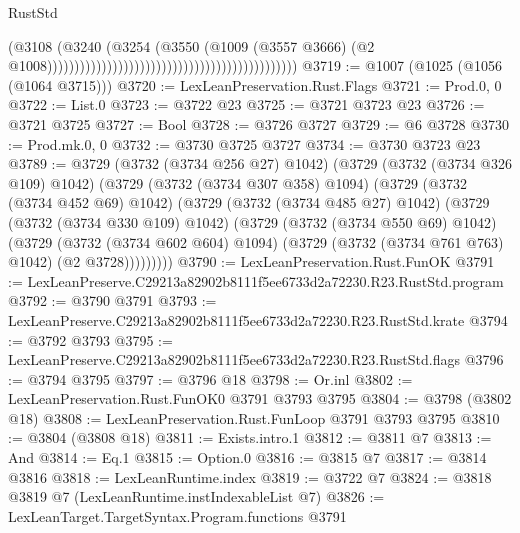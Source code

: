 \begin{lexlean}{RustStd}
\begin{coremodule}
                                                                                    (@3108
                                                                                      (@3240
                                                                                        (@3254
                                                                                          (@3550
                                                                                            (@1009
                                                                                              (@3557
                                                                                                @3666)
                                                                                              (@2
                                                                                                @1008))))))))))))))))))))))))))))))))))))))))))))))
@3719 := @1007 (@1025 (@1056 (@1064 @3715)))
@3720 := LexLeanPreservation.Rust.Flags
@3721 := Prod.{0, 0}
@3722 := List.{0}
@3723 := @3722 @23
@3725 := @3721 @3723 @23
@3726 := @3721 @3725
@3727 := Bool
@3728 := @3726 @3727
@3729 := @6 @3728
@3730 := Prod.mk.{0, 0}
@3732 := @3730 @3725 @3727
@3734 := @3730 @3723 @23
@3789 := @3729
    (@3732 (@3734 @256 @27) @1042)
    (@3729
      (@3732 (@3734 @326 @109) @1042)
      (@3729
        (@3732 (@3734 @307 @358) @1094)
        (@3729
          (@3732 (@3734 @452 @69) @1042)
          (@3729
            (@3732 (@3734 @485 @27) @1042)
            (@3729
              (@3732 (@3734 @330 @109) @1042)
              (@3729
                (@3732 (@3734 @550 @69) @1042)
                (@3729
                  (@3732 (@3734 @602 @604) @1094)
                  (@3729 (@3732 (@3734 @761 @763) @1042) (@2 @3728)))))))))
@3790 := LexLeanPreservation.Rust.FunOK
@3791 := LexLeanPreserve.C29213a82902b8111f5ee6733d2a72230.R23.RustStd.program
@3792 := @3790 @3791
@3793 := LexLeanPreserve.C29213a82902b8111f5ee6733d2a72230.R23.RustStd.krate
@3794 := @3792 @3793
@3795 := LexLeanPreserve.C29213a82902b8111f5ee6733d2a72230.R23.RustStd.flags
@3796 := @3794 @3795
@3797 := @3796 @18
@3798 := Or.inl
@3802 := LexLeanPreservation.Rust.FunOK0 @3791 @3793 @3795
@3804 := @3798 (@3802 @18)
@3808 := LexLeanPreservation.Rust.FunLoop @3791 @3793 @3795
@3810 := @3804 (@3808 @18)
@3811 := Exists.intro.{1}
@3812 := @3811 @7
@3813 := And
@3814 := Eq.{1}
@3815 := Option.{0}
@3816 := @3815 @7
@3817 := @3814 @3816
@3818 := LexLeanRuntime.index
@3819 := @3722 @7
@3824 := @3818 @3819 @7 (LexLeanRuntime.instIndexableList @7)
@3826 := LexLeanTarget.TargetSyntax.Program.functions @3791

\end{coremodule}
\end{lexlean}
